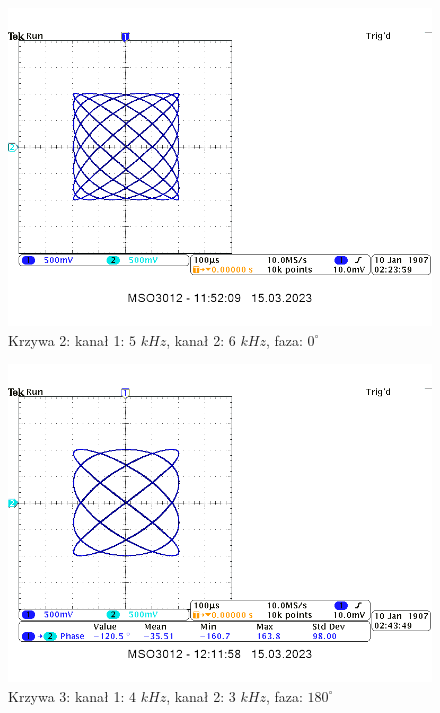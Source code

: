 \documentclass[14pt, table]{extarticle}
\begin{document}
\begin{figure}[H]
\includegraphics[scale=0.55]{A5}
\centering
\captionsetup{labelformat=empty}
\caption{Krzywa 2: kanał 1: $ 5$ $kHz$, kanał 2: $ 6$ $kHz$, faza: $0^{\circ}$}
\end{figure}

\begin{figure}[H]
\includegraphics[scale=0.55]{A6}
\centering
\captionsetup{labelformat=empty}
\caption{Krzywa 3: kanał 1: $ 4$ $kHz$, kanał 2: $ 3$ $kHz$, faza: $180^{\circ}$}
\end{figure}
\end{document}
